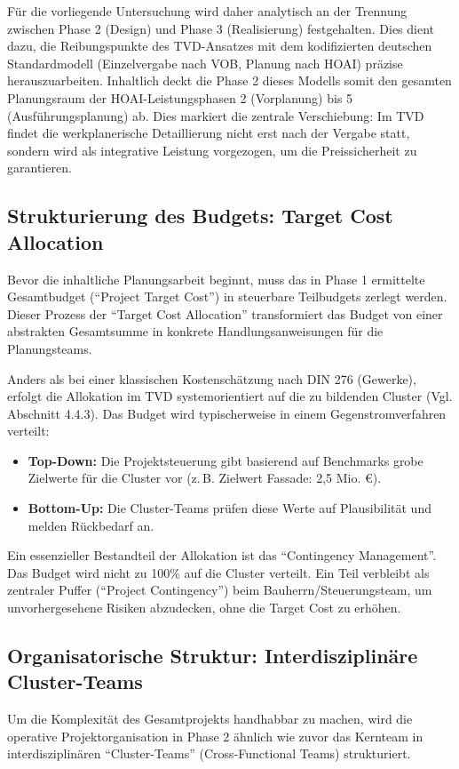 Für die vorliegende Untersuchung wird daher analytisch an der Trennung zwischen Phase 2 (Design) und Phase 3 (Realisierung) festgehalten. Dies dient dazu, die Reibungspunkte des \acs{TVD}-Ansatzes mit dem kodifizierten deutschen Standardmodell (Einzelvergabe nach \acs{VOB}, Planung nach \acs{HOAI}) präzise herauszuarbeiten. Inhaltlich deckt die Phase 2 dieses Modells somit den gesamten Planungsraum der \acs{HOAI}-Leistungsphasen 2 (Vorplanung) bis 5 (Ausführungsplanung) ab. Dies markiert die zentrale Verschiebung: Im \acs{TVD} findet die werkplanerische Detaillierung nicht erst nach der Vergabe statt, sondern wird als integrative Leistung vorgezogen, um die Preissicherheit zu garantieren.


\subsection{Strukturierung des Budgets: Target Cost Allocation}
\label{sec:4.4.2}
Bevor die inhaltliche Planungsarbeit beginnt, muss das in Phase 1 ermittelte Gesamtbudget (\enquote{Project Target Cost}) in steuerbare Teilbudgets zerlegt werden. Dieser Prozess der \enquote{Target Cost Allocation} transformiert das Budget von einer abstrakten Gesamtsumme in konkrete Handlungsanweisungen für die Planungsteams.

Anders als bei einer klassischen Kostenschätzung nach DIN 276 (Gewerke), erfolgt die Allokation im \acs{TVD} systemorientiert auf die zu bildenden Cluster (Vgl. Abschnitt 4.4.3). Das Budget wird typischerweise in einem Gegenstromverfahren verteilt:\autocite[Vgl.][S.~39 f]{hill_target_2017}

\begin{itemize}
    \item \textbf{Top-Down:} Die Projektsteuerung gibt basierend auf Benchmarks grobe Zielwerte für die Cluster vor (z.\,B. Zielwert Fassade: 2,5 Mio. €).
    \item \textbf{Bottom-Up:} Die Cluster-Teams prüfen diese Werte auf Plausibilität und melden Rückbedarf an.
\end{itemize}
Ein essenzieller Bestandteil der Allokation ist das \enquote{Contingency Management}. Das Budget wird nicht zu 100\% auf die Cluster verteilt. Ein Teil verbleibt als zentraler Puffer (\enquote{Project Contingency}) beim Bauherrn/Steuerungsteam, um unvorhergesehene Risiken abzudecken, ohne die Target Cost zu erhöhen.\autocite[Vgl.][S.~43]{hill_target_2017}


\subsection{Organisatorische Struktur: Interdisziplinäre Cluster-Teams}
\label{sec:4.4.3}
Um die Komplexität des Gesamtprojekts handhabbar zu machen, wird die operative Projektorganisation in Phase 2 ähnlich wie zuvor das Kernteam in interdisziplinären \enquote{Cluster-Teams} (Cross-Functional Teams) strukturiert.\autocite[Vgl.][S.~59]{hill_target_2017}


